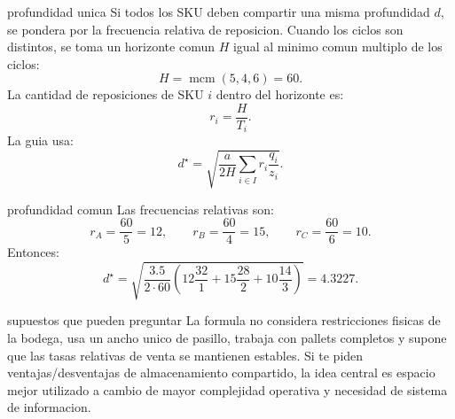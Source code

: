 \begin{materia}{profundidad unica}
Si todos los SKU deben compartir una misma profundidad $d$, se pondera por la frecuencia relativa de reposicion. Cuando los ciclos son distintos, se toma un horizonte comun $H$ igual al minimo comun multiplo de los ciclos:
\[
  H=\operatorname{mcm}(5,4,6)=60.
\]
La cantidad de reposiciones de SKU $i$ dentro del horizonte es:
\[
  r_i=\frac{H}{T_i}.
\]
La guia usa:
\[
  d^\star=
  \sqrt{
  \frac{a}{2H}
  \sum_{i\in I}r_i\frac{q_i}{z_i}
  }.
\]
\end{materia}

\begin{solucion}{profundidad comun}
Las frecuencias relativas son:
\[
  r_A=\frac{60}{5}=12,\qquad
  r_B=\frac{60}{4}=15,\qquad
  r_C=\frac{60}{6}=10.
\]
Entonces:
\[
  d^\star=
  \sqrt{
  \frac{3.5}{2\cdot 60}
  \left(
  12\frac{32}{1}
  +15\frac{28}{2}
  +10\frac{14}{3}
  \right)
  }
  =
  4.3227.
\]
\end{solucion}

\begin{alerta}{supuestos que pueden preguntar}
La formula no considera restricciones fisicas de la bodega, usa un ancho unico de pasillo, trabaja con pallets completos y supone que las tasas relativas de venta se mantienen estables. Si te piden ventajas/desventajas de almacenamiento compartido, la idea central es espacio mejor utilizado a cambio de mayor complejidad operativa y necesidad de sistema de informacion.
\end{alerta}
